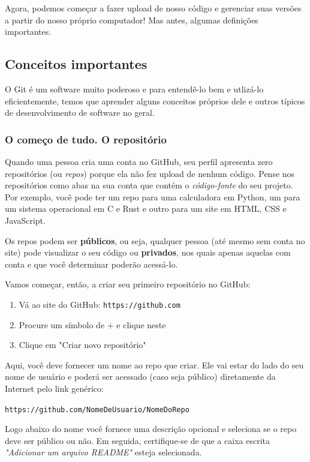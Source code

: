 \documentclass{article}
\begin{document}
	Agora, podemos começar a fazer upload de nosso código e gerenciar suas versões a partir do nosso próprio computador! Mas antes,
	algumas definições importantes. 

	\subsection{Conceitos importantes}

	O Git é um software muito poderoso e para entendê-lo bem e utlizá-lo eficientemente, temos que aprender alguns conceitos 
	próprios dele e outros típicos de desenvolvimento de software no geral. 

	\subsubsection{O começo de tudo. O repositório}

	Quando uma pessoa cria uma conta no GitHub, seu perfil apresenta zero repositórios (ou \textit{repos}) porque ela não fez upload de nenhum 
	código. Pense nos repositórios como abas na sua conta que contém o \textit{código-fonte} do seu projeto. Por exemplo, 
	você pode ter um repo para uma calculadora em Python, um para um sistema operacional em C e Rust e outro para um site em 
	HTML, CSS e JavaScript. 

	Os repos podem ser \textbf{públicos}, ou seja, qualquer pessoa (até mesmo sem conta no site) pode visualizar o seu código ou 
	\textbf{privados}, nos quais apenas aquelas com conta e que você determinar poderão acessá-lo. 

	Vamos começar, então, a criar seu primeiro repositório no GitHub: 
	\begin{enumerate} 
		\item{Vá ao site do GitHub: \texttt{https://github.com}}
		\item{Procure um símbolo de $ + $ e clique neste}
		\item{Clique em "Criar novo repositório"}
	\end{enumerate}

	Aqui, você deve fornecer um nome ao repo que criar. Ele vai estar do lado do seu nome de usuário e poderá ser acessado 
	(caso seja público) diretamente da Internet pelo link genérico: 
	
	\vspace{1ex}
	\texttt{https://github.com/NomeDeUsuario/NomeDoRepo}
	\vspace{1ex}

	Logo abaixo do nome você fornece uma descrição opcional e seleciona se o repo deve ser público ou não. 
	Em seguida, certifique-se de que a caixa escrita \textit{"Adicionar um arquivo README"} esteja selecionada. 
	
\end{document}
